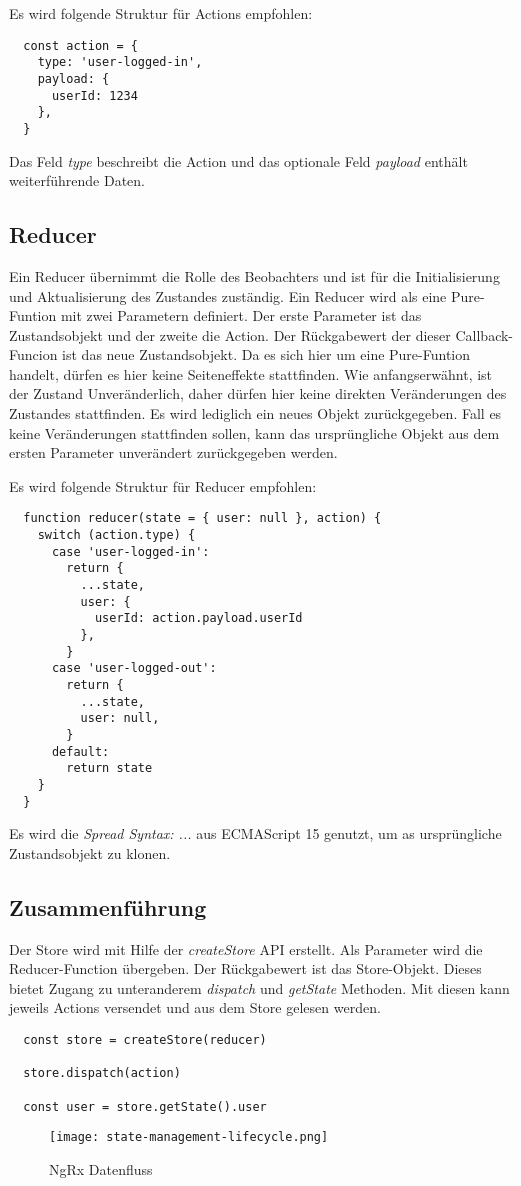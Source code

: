 Es wird folgende Struktur für Actions empfohlen:
\begin{lstlisting}
  const action = {
    type: 'user-logged-in',
    payload: {
      userId: 1234
    },
  }
\end{lstlisting}

Das Feld \textit{type} beschreibt die Action und das optionale Feld \textit{payload} enthält weiterführende Daten.

\subsection{Reducer}

Ein Reducer übernimmt die Rolle des Beobachters und ist für die Initialisierung und Aktualisierung des Zustandes zuständig. Ein Reducer wird als eine Pure-Funtion mit zwei Parametern definiert.
Der erste Parameter ist das Zustandsobjekt und der zweite die Action. Der Rückgabewert der dieser Callback-Funcion ist das neue Zustandsobjekt. Da es sich hier um eine Pure-Funtion handelt, dürfen es hier keine Seiteneffekte stattfinden. Wie anfangserwähnt, ist der Zustand Unveränderlich, daher dürfen hier keine direkten Veränderungen des Zustandes stattfinden. Es wird lediglich ein neues Objekt zurückgegeben. Fall es keine Veränderungen stattfinden sollen, kann das ursprüngliche Objekt aus dem ersten Parameter unverändert zurückgegeben werden.\cite{reduxStateActionReducers}

Es wird folgende Struktur für Reducer empfohlen:
\begin{lstlisting}
  function reducer(state = { user: null }, action) {
    switch (action.type) {
      case 'user-logged-in':
        return {
          ...state,
          user: {
            userId: action.payload.userId
          },
        }
      case 'user-logged-out':
        return {
          ...state,
          user: null,
        }
      default:
        return state
    }
  }
\end{lstlisting}

Es wird die \textit{Spread Syntax: ...} aus ECMAScript 15 genutzt, um as ursprüngliche Zustandsobjekt zu klonen.\cite{mdnSpreadSyntax}

\subsection{Zusammenführung}

Der Store wird mit Hilfe der \textit{createStore} API erstellt. Als Parameter wird die Reducer-Function übergeben. Der Rückgabewert ist das Store-Objekt. Dieses bietet Zugang zu unteranderem \textit{dispatch} und \textit{getState} Methoden. Mit diesen kann jeweils Actions versendet und aus dem Store gelesen werden.

\begin{lstlisting}
  const store = createStore(reducer)

  store.dispatch(action)

  const user = store.getState().user
\end{lstlisting}

\begin{figure}[h!]
\texttt{[image: state-management-lifecycle.png]}
\caption{NgRx Datenfluss}
\end{figure}